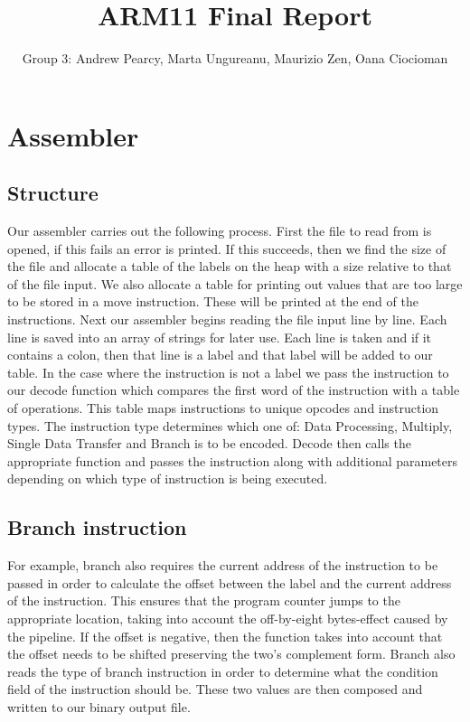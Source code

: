 \documentclass[11pt]{article}
\begin{document}
\title{ARM11 Final Report}
\author{Group 3: Andrew Pearcy, Marta Ungureanu, Maurizio Zen, Oana Ciocioman}

\maketitle

\section{Assembler}
\subsection{Structure}
Our assembler carries out the following process. First the file to read from is opened, if this fails an error is printed. If this succeeds, then we find the size of the file and allocate a table of the labels on the heap with a size relative to that of the file input. We also allocate a table for printing out values that are too large to be stored in a move instruction. These will be printed at the end of the instructions. Next our assembler begins reading the file input line by line.  Each line is saved into an array of strings for later use. Each line is taken and if it contains a colon, then that line is a label and that label will be added to our table. In the case where the instruction is not a label we pass the instruction to our decode function which compares the first word of the instruction with a table of operations. This table maps instructions to unique opcodes and instruction types. The instruction type determines which one of: Data Processing, Multiply, Single Data Transfer and Branch is to be encoded. Decode then calls the appropriate function and passes the instruction along with additional parameters depending on which type of instruction is being executed. \par
\subsection{Branch instruction}
For example, branch also requires the current address of the instruction to be passed in order to calculate the offset between the label and the current address of the instruction. This ensures that the program counter jumps to the appropriate location, taking into account the off-by-eight bytes-effect caused by the pipeline. If the offset is negative, then the function takes into account that the offset needs to be shifted preserving the two’s complement form. Branch also reads the type of branch instruction in order to determine what the condition field of the instruction should be. These two values are then composed and written to our binary output file.\par
\end{document}

